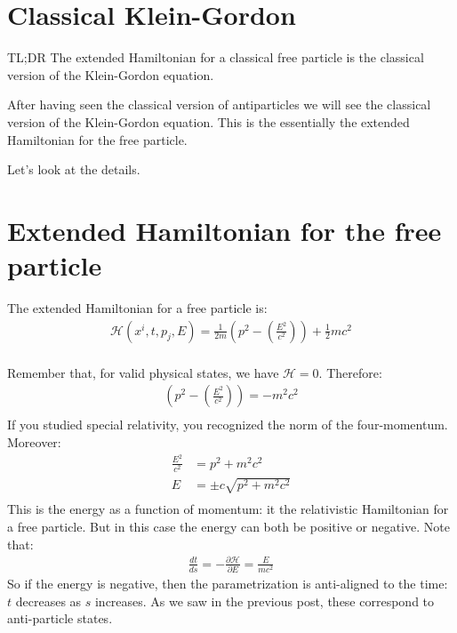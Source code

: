 \documentclass[aps,pra,10pt,floatfix,nofootinbib]{revtex4-1}
\theoremstyle{definition}
\begin{document}
\section{Classical Klein-Gordon}

TL;DR The extended Hamiltonian for a classical free particle is the classical version of the Klein-Gordon equation.

After having seen the classical version of antiparticles we will see the classical version of the Klein-Gordon equation. This is the essentially the extended Hamiltonian for the free particle.

Let's look at the details.

\section{Extended Hamiltonian for the free particle}

The extended Hamiltonian for a free particle is:
\begin{equation}
\begin{aligned}
\mathcal{H}(x^i,t,p_j,E) = \frac{1}{2m} \left(p^2 - \left(\frac{E^2}{c^2}\right)\right)  + \frac{1}{2} mc^2\\
\end{aligned}
\label{ExtendedHamiltonFree}
\end{equation}

Remember that, for valid physical states, we have $\mathcal{H}=0$. Therefore:
\begin{equation}
\begin{aligned}
\left(p^2 - \left(\frac{E^2}{c^2}\right)\right) = - m^2c^2\\
\end{aligned}
\label{FourMomentum}
\end{equation}
If you studied special relativity, you recognized the norm of the four-momentum. Moreover:
\begin{equation}
\begin{aligned}
\frac{E^2}{c^2} &= p^2 + m^2c^2\\
E &= \pm c \sqrt{p^2 + m^2c^2} \\
\end{aligned}
\label{HamiltonFree}
\end{equation}
This is the energy as a function of momentum: it the relativistic Hamiltonian for a free particle. But in this case the energy can both be positive or negative. Note that:
\begin{equation}
\begin{aligned}
\frac{dt}{ds} = - \frac{\partial \mathcal{H}}{\partial E} = \frac{E}{mc^2}
\end{aligned}
\label{TimeEvolution}
\end{equation}
So if the energy is negative, then the parametrization is anti-aligned to the time: $t$ decreases as $s$ increases. As we saw in the previous post, these correspond to anti-particle states.
\end{document}
